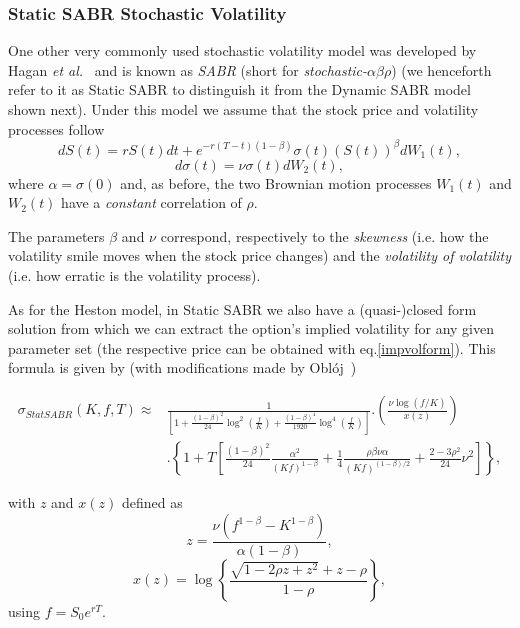 \vspace{5pt}
\subsubsection{Static SABR Stochastic Volatility}
One other very commonly used stochastic volatility model was developed by Hagan \textit{et al.}~\citep{Hagan} and is known as \emph{SABR} (short for \emph{stochastic-}$\alpha\beta\rho$) (we henceforth refer to it as Static SABR to distinguish it from the Dynamic SABR model shown next). Under this model we assume that the stock price and volatility processes follow~\citep{Geeske}
\begin{equation}\label{dF}
dS(t)=rS(t)dt+e^{-r(T-t)(1-\beta)}\sigma(t)(S(t))^\beta dW_1(t),
\end{equation}
\begin{equation}\label{dsigma}
d\sigma(t)=\nu\sigma(t) dW_2(t),
\end{equation}
\noindent where $\alpha=\sigma(0)$ and, as before, the two Brownian motion processes $W_1(t)$ and $W_2(t)$ have a \emph{constant} correlation of $\rho$.

The parameters $\beta$ and $\nu$ correspond, respectively to the \emph{skewness} (i.e. how the volatility smile moves when the stock price changes) and the \emph{volatility of volatility} (i.e. how erratic is the volatility process).

As for the Heston model, in Static SABR we also have a (quasi-)closed form solution from which we can extract the option's implied volatility for any given parameter set (the respective price can be obtained with eq.\eqref{impvolform}). This formula is given by (with modifications made by Oblój~\citep{Obloj})

\newpage

\begin{strip2}
\begin{equation}\label{sabr}
\begin{split}
\sigma_{StatSABR}(K,f,T)\approx&\frac{1}{\displaystyle\left[1+\frac{(1-\beta)^2}{24}\log^2\left(\frac{f}{K}\right)+\frac{(1-\beta)^4}{1920}\log^4\left(\frac{f}{K}\right)\right]}.\left(\frac{\nu\log\left(f/K\right)}{x(z)}\right)\\
&.\left\{1+T\left[\frac{(1-\beta)^2}{24}\frac{\alpha^2}{(Kf)^{1-\beta}}+\frac{1}{4}\frac{\rho\beta\nu\alpha}{(Kf)^{(1-\beta)/2}}+\frac{2-3\rho^2}{24}\nu^2\right]\right\},
\end{split}
\end{equation}
\end{strip2}
\noindent with $z$ and $x(z)$ defined as
\begin{equation}
z=\frac{\nu\left(f^{1-\beta}-K^{1-\beta}\right)}{\alpha(1-\beta)},
\end{equation}
\begin{equation}
x(z)=\log\left\{\frac{\sqrt{1-2\rho z+z^2}+z-\rho}{1-\rho}\right\},
\end{equation}
\noindent using $f=S_0e^{rT}$.

